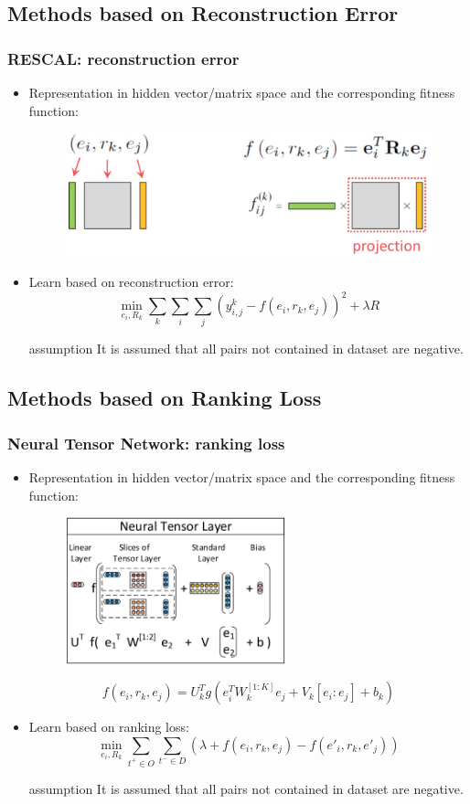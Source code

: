 \documentclass[pdf,10pt]{beamer}
\begin{document}
\subsection{Methods based on Reconstruction Error}
\begin{frame}
\frametitle{RESCAL: reconstruction error}
\begin{itemize}
	\item Representation in hidden vector/matrix space and the corresponding fitness function:
		\begin{figure}
			\includegraphics[height=0.20\textwidth]{5.eps}
		\end{figure}
	\item Learn based on reconstruction error:
		$$\min_{e_i,R_k}\sum_k\sum_i\sum_j{(y_{i,j}^k-f(e_i,r_k,e_j))^2+\lambda R}$$
	\begin{exampleblock}{assumption}
		It is assumed that all pairs not contained in dataset are negative.
	\end{exampleblock}
\end{itemize}
\end{frame}

\subsection{Methods based on Ranking Loss}
\begin{frame}
\frametitle{Neural Tensor Network: ranking loss}
\begin{itemize}
	\item Representation in hidden vector/matrix space and the corresponding fitness function:
		\begin{figure}
			\includegraphics[width=0.60\textwidth,height=0.30\textwidth]{7.eps}
		\end{figure}
		$$f(e_i,r_k,e_j)=U_k^Tg(e_i^TW_k^{[1:K]}e_j + V_k[e_i:e_j] + b_k)$$
	\item Learn based on ranking loss:
		$$\min_{e_i,R_k}\sum_{t^+ \in O}\sum_{t^- \in D}{(\lambda + f(e_i,r_k,e_j) - f(e'_i,r_k,e'_j))}$$
	\begin{exampleblock}{assumption}
		It is assumed that all pairs not contained in dataset are negative.
	\end{exampleblock}
\end{itemize}
\end{frame}
\end{document}

